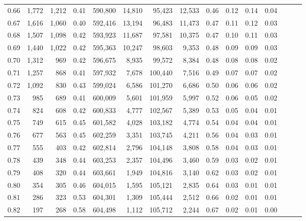 \begin{tabular}{rrrrrrrrrrrrrrr}
0.66 &   1,772 &  1,212 &  0.41 &  590,800 &   14,810 &   95,423 &   12,533 &  0.46 &  0.12 &  0.14 &      0.04 \\
0.67 &   1,616 &  1,060 &  0.40 &  592,416 &   13,194 &   96,483 &   11,473 &  0.47 &  0.11 &  0.12 &      0.03 \\
0.68 &   1,507 &  1,098 &  0.42 &  593,923 &   11,687 &   97,581 &   10,375 &  0.47 &  0.10 &  0.11 &      0.03 \\
0.69 &   1,440 &  1,022 &  0.42 &  595,363 &   10,247 &   98,603 &    9,353 &  0.48 &  0.09 &  0.09 &      0.03 \\
0.70 &   1,312 &    969 &  0.42 &  596,675 &    8,935 &   99,572 &    8,384 &  0.48 &  0.08 &  0.08 &      0.02 \\
0.71 &   1,257 &    868 &  0.41 &  597,932 &    7,678 &  100,440 &    7,516 &  0.49 &  0.07 &  0.07 &      0.02 \\
0.72 &   1,092 &    830 &  0.43 &  599,024 &    6,586 &  101,270 &    6,686 &  0.50 &  0.06 &  0.06 &      0.02 \\
0.73 &     985 &    689 &  0.41 &  600,009 &    5,601 &  101,959 &    5,997 &  0.52 &  0.06 &  0.05 &      0.02 \\
0.74 &     824 &    608 &  0.42 &  600,833 &    4,777 &  102,567 &    5,389 &  0.53 &  0.05 &  0.04 &      0.01 \\
0.75 &     749 &    615 &  0.45 &  601,582 &    4,028 &  103,182 &    4,774 &  0.54 &  0.04 &  0.04 &      0.01 \\
0.76 &     677 &    563 &  0.45 &  602,259 &    3,351 &  103,745 &    4,211 &  0.56 &  0.04 &  0.03 &      0.01 \\
0.77 &     555 &    403 &  0.42 &  602,814 &    2,796 &  104,148 &    3,808 &  0.58 &  0.04 &  0.03 &      0.01 \\
0.78 &     439 &    348 &  0.44 &  603,253 &    2,357 &  104,496 &    3,460 &  0.59 &  0.03 &  0.02 &      0.01 \\
0.79 &     408 &    320 &  0.44 &  603,661 &    1,949 &  104,816 &    3,140 &  0.62 &  0.03 &  0.02 &      0.01 \\
0.80 &     354 &    305 &  0.46 &  604,015 &    1,595 &  105,121 &    2,835 &  0.64 &  0.03 &  0.01 &      0.01 \\
0.81 &     286 &    323 &  0.53 &  604,301 &    1,309 &  105,444 &    2,512 &  0.66 &  0.02 &  0.01 &      0.01 \\
0.82 &     197 &    268 &  0.58 &  604,498 &    1,112 &  105,712 &    2,244 &  0.67 &  0.02 &  0.01 &      0.00 \\

\end{tabular}
